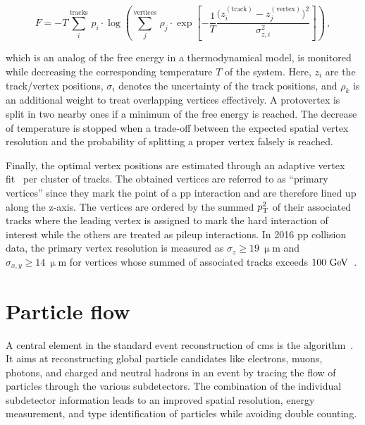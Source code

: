 \begin{equation}
F=-T\sum_{i}^\mathrm{tracks}\,p_{i}\cdot\log\left(\sum_{j}^\mathrm{vertices}\,\rho_{j}\cdot\exp\left[-\frac{1}{T}\frac{\Big(z_{i}^\mathrm{(track)}-z_{j}^\mathrm{(vertex)}\Big)^2}{\sigma_{z,i}^2}\right]\right)\,,
\end{equation}
 
which is an analog of the free energy in a thermodynamical model, is monitored while decreasing the corresponding temperature $T$ of the system. Here, $z_{i}$ are the track/vertex positions, $\sigma_{i}$ denotes the uncertainty of the track positions, and $\rho_{k}$ is an additional weight to treat overlapping vertices effectively. A protovertex is split in two nearby ones if a minimum of the free energy is reached. The decrease of temperature is stopped when a trade-off between the expected spatial vertex resolution and the probability of splitting a proper vertex falsely is reached.

Finally, the optimal vertex positions are estimated through an adaptive vertex fit~\cite{0954-3899-34-12-N01} per cluster of tracks. The obtained vertices are referred to as ``primary vertices'' since they mark the point of a \gls{pp} interaction and are therefore lined up along the z-axis. The vertices are ordered by the summed $p_\textrm{T}^2$ of their associated tracks where the leading vertex is assigned to mark the hard interaction of interest while the others are treated as pileup interactions. In 2016 \gls{pp} collision data, the primary vertex resolution is measured as $\sigma_{z}\geq19~\upmu\mathrm{m}$ and $\sigma_{x,y}\geq14~\upmu\mathrm{m}$ for vertices whose summed \pt of associated tracks exceeds $100~\textrm{GeV}$~\cite{CMS-DP-2016-041}.



\section{Particle flow}


A central element in the standard event reconstruction of \gls{cms} is the  algorithm~\cite{CMS:2009nxa}. It aims at reconstructing global particle candidates like electrons, muons, photons, and charged and neutral hadrons in an event by tracing the flow of particles through the various subdetectors. The combination of the individual subdetector information leads to an improved spatial resolution, energy measurement, and type identification of particles while avoiding double counting.

